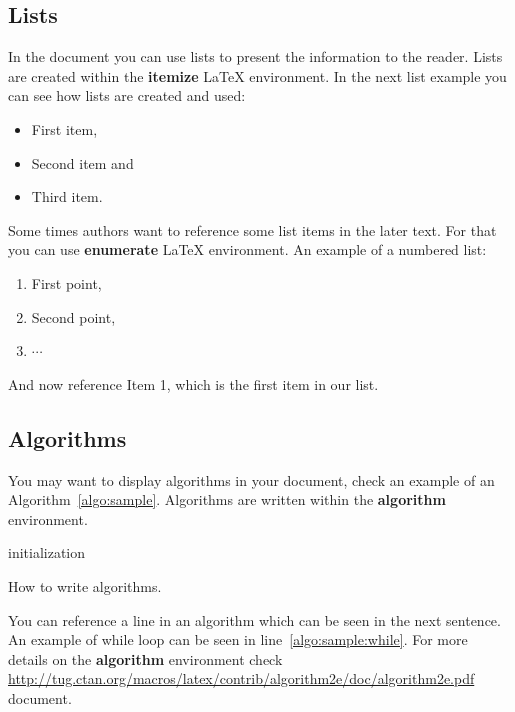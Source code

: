 \documentclass[article,english]{stucosrec}
\newcommand{\latex}{\LaTeX\xspace}
\newcommand{\latexe}{\LaTeX$2_\epsilon$\xspace}
\begin{document}
	\subsection{Lists}
	
	In the document you can use lists to present the information to the reader.
	Lists are created within the \textbf{itemize} \latex environment.
	In the next list example you can see how lists are created and used:
	
	\begin{itemize}
		\item First item,
		\item Second item and
		\item Third item.
	\end{itemize}
	
	Some times authors want to reference some list items in the later text.
	For that you can use \textbf{enumerate} \latex environment.
	An example of a numbered list:
	
	\begin{enumerate}
	    \item First point,
	    \item Second point,
	    \item $\cdots$
	\end{enumerate}
	
	And now reference Item 1, which is the first item in our list.

	\subsection{Algorithms}
	
	You may want to display algorithms in your document, check an example of an Algorithm~\ref{algo:sample}.
	Algorithms are written within the \textbf{algorithm} environment.
	
	\begin{algorithm}
		\SetAlgoLined
		\KwResult{how to write algorithm with \latexe}
		initialization\;
		\caption{How to write algorithms.}
		\label{algo:sample}
	\end{algorithm}

	You can reference a line in an algorithm which can be seen in the next sentence.
	An example of while loop can be seen in line~\ref{algo:sample:while}.
	For more details on the \textbf{algorithm} environment check \url{http://tug.ctan.org/macros/latex/contrib/algorithm2e/doc/algorithm2e.pdf} document.
	
\end{document}
